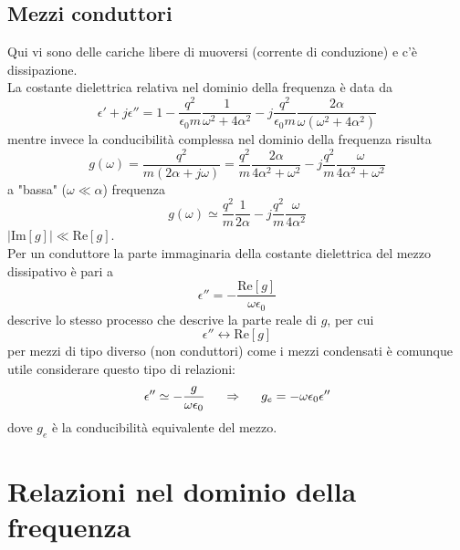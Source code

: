 \documentclass[a4paper]{article}
\begin{document}
\subsection*{Mezzi conduttori}
Qui vi sono delle cariche libere di muoversi (corrente di conduzione) e c'è dissipazione.\\
La costante dielettrica relativa nel dominio della frequenza è data da
\begin{equation*}
\epsilon'+j\epsilon''=1-\frac{q^2}{\epsilon_0m}\frac{1}{\omega^2+4\alpha^2}-j\frac{q^2}{\epsilon_0m}\frac{2\alpha}{\omega(\omega^2+4\alpha^2)}
\end{equation*}
mentre invece la conducibilità complessa nel dominio della frequenza risulta
\begin{equation*}
g(\omega)=\frac{q^2}{m(2\alpha+j\omega)}=\frac{q^2}{m}\frac{2\alpha}{4\alpha^2+\omega^2}-j\frac{q^2}{m}\frac{\omega}{4\alpha^2+\omega^2}
\end{equation*}
a "bassa" ($\omega\ll\alpha$) frequenza
\begin{equation*}
g(\omega)\simeq\frac{q^2}{m}\frac{1}{2\alpha}-j\frac{q^2}{m}\frac{\omega}{4\alpha^2}
\end{equation*}
$|\mathrm{Im}[g]|\ll\mathrm{Re}[g]$.\\
Per un conduttore la parte immaginaria della costante dielettrica del mezzo dissipativo è pari a
\begin{equation*}
\epsilon''=-\frac{\mathrm{Re}[g]}{\omega\epsilon_0}
\end{equation*}
descrive lo stesso processo che descrive la parte reale di $g$, per cui
\begin{equation*}
\epsilon''\leftrightarrow\mathrm{Re}[g]
\end{equation*}
per mezzi di tipo diverso (non conduttori) come i mezzi condensati è comunque utile considerare questo tipo di relazioni:
\begin{equation*}
\epsilon''\simeq-\frac{g}{\omega\epsilon_0}\hspace{5mm}\Rightarrow\hspace{5mm}g_e=-\omega\epsilon_0\epsilon''
\end{equation*}
dove $g_e$ è la conducibilità equivalente del mezzo.
\section{Relazioni nel dominio della frequenza}
\end{document}
